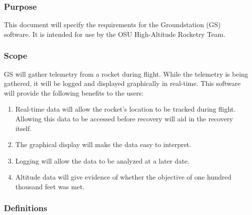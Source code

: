 \documentclass[10pt,draftclsnofoot,onecolumn]{IEEEtran}
\begin{document}
	\subsubsection{Purpose}
	This document will specify the requirements for the Groundstation (GS) software.
	It is intended for use by the OSU High-Altitude Rocketry Team.

	\subsubsection{Scope}
	GS will gather telemetry from a rocket during flight.
	While the telemetry is being gathered, it will be logged and displayed graphically in real-time.
	This software will provide the following benefits to the users:
	\begin{enumerate}
		\item Real-time data will allow the rocket's location to be tracked during flight.
		Allowing this data to be accessed before recovery will aid in the recovery itself.
		\item The graphical display will make the data easy to interpret.
		\item Logging will allow the data to be analyzed at a later date.
		\item Altitude data will give evidence of whether the objective of one hundred thousand feet was met.
	\end{enumerate}

	\subsubsection{Definitions}
\end{document}
